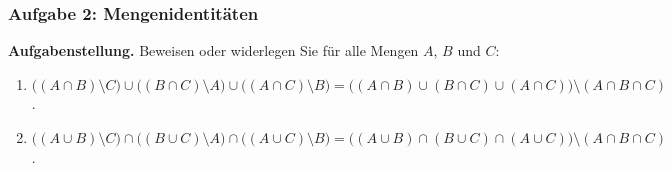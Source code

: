 \subsubsection*{Aufgabe 2: Mengenidentitäten}

\noindent\textbf{Aufgabenstellung.}
Beweisen oder widerlegen Sie für alle Mengen $A$, $B$ und $C$:
\begin{enumerate}
    \item $\bigl((A\cap B)\setminus C\bigr)\cup\bigl((B\cap C)\setminus A\bigr)\cup\bigl((A\cap C)\setminus B\bigr)
    = \bigl((A\cap B)\cup(B\cap C)\cup(A\cap C)\bigr)\setminus(A\cap B\cap C)$.
    \item $\bigl((A\cup B)\setminus C\bigr)\cap\bigl((B\cup C)\setminus A\bigr)\cap\bigl((A\cup C)\setminus B\bigr)
    = \bigl((A\cup B)\cap(B\cup C)\cap(A\cup C)\bigr)\setminus(A\cap B\cap C)$.
\end{enumerate}

